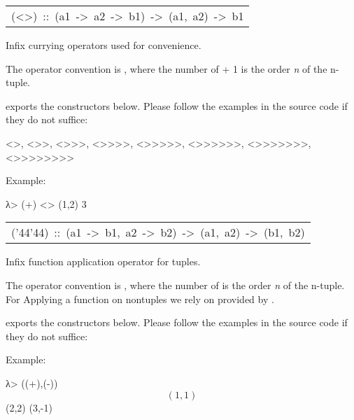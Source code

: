 \begin{haddockdesc}
\begin{interactive}
\end{interactive}

\item[\begin{tabular}{@{}l}
(<>)\ ::\ (a1\ ->\ a2\ ->\ b1)\ ->\ (a1,\ a2)\ ->\ b1
\end{tabular}]\haddockbegindoc
Infix currying operators used for convenience. \par
The operator convention is \haddocktt{(<>+)}, where the number of \haddocktt{>} + 1 is
 the order \emph{n} of the n-tuple.\par
{} exports the constructors below. Please
 follow the examples in the source code if they do not suffice:\par
\begin{interactive}
<>, <>>, <>>>, <>>>>, <>>>>>, <>>>>>>, <>>>>>>>, <>>>>>>>>\end{interactive}
Example:\par
\begin{interactive}
λ> (+) <> (1,2)
3

\end{interactive}

\item[\begin{tabular}{@{}l}
({\char '44}{\char '44})\ ::\ (a1\ ->\ b1,\ a2\ ->\ b2)\ ->\ (a1,\ a2)\ ->\ (b1,\ b2)
\end{tabular}]\haddockbegindoc
Infix function application operator for tuples. \par
The operator convention is , where the number of  is the
 order \emph{n} of the n-tuple. For Applying a function on nontuples we
 rely on  provided by .\par
{} exports the constructors below. Please
 follow the examples in the source code if they do not suffice:\par
\begin{interactive}
$$, $$$, $$$$, $$$$$, $$$$$$, $$$$$$$, $$$$$$$$, $$$$$$$$$\end{interactive}
Example:\par
\begin{interactive}
λ> ((+),(-)) $$ (1,1) $$ (2,2)
(3,-1)

\end{interactive}
\end{haddockdesc}